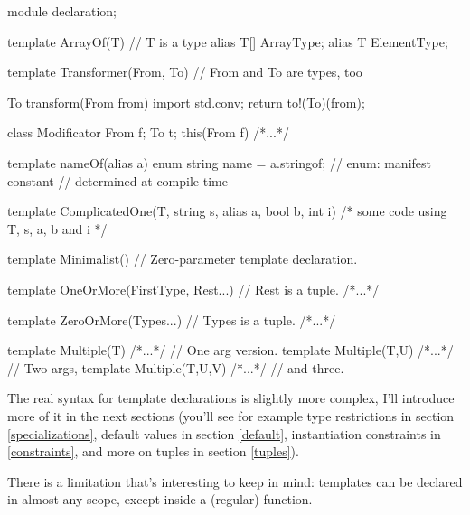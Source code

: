 \begin{ndcode}
module declaration;

template ArrayOf(T) // T is a type
{
    alias T[] ArrayType;
    alias T ElementType;
}

template Transformer(From, To) // From and To are types, too
{
    To transform(From from) 
    { 
        import std.conv;
        return to!(To)(from);
    }

    class Modificator
    {
        From f;
        To t;
        this(From f) { /*...*/ }
    }
}

template nameOf(alias a)
{
    enum string name = a.stringof; // enum: manifest constant
                                   // determined at compile-time
}

template ComplicatedOne(T, string s, alias a, bool b, int i)
{ /* some code using T, s, a, b and i */ }

template Minimalist() {} // Zero-parameter template declaration.

template OneOrMore(FirstType, Rest...) // Rest is a tuple.
{ /*...*/ }

template ZeroOrMore(Types...) // Types is a tuple.
{ /*...*/ }

template Multiple(T)     { /*...*/ } // One arg version.
template Multiple(T,U)   { /*...*/ } // Two args,
template Multiple(T,U,V) { /*...*/ } // and three.
\end{ndcode}

The real syntax for template declarations is slightly more complex, I'll introduce more of it in the next sections (you'll see for example type restrictions in section \ref{specializations}, default values in section \ref{default}, instantiation constraints in \ref{constraints}, and more on tuples in section \ref{tuples}).

There is a limitation that's interesting to keep in mind: templates can be declared in almost any scope, except inside a (regular) function.


